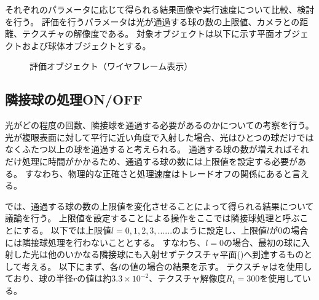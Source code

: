 それぞれのパラメータに応じて得られる結果画像や実行速度について比較、検討を行う。
評価を行うパラメータは光が通過する球の数の上限値、カメラとの距離、テクスチャの解像度である。
対象オブジェクトは以下に示す平面オブジェクトおよび球体オブジェクトとする。
\begin{figure}[htbp]
  \centering
{}
  \caption{評価オブジェクト（ワイヤフレーム表示）}
  \label{FEvalObject}
\end{figure}


\subsection{隣接球の処理ON/OFF}
\label{SSLimitNeighborSphere}

光がどの程度の回数、隣接球を通過する必要があるのかについての考察を行う。
光が複眼表面に対して平行に近い角度で入射した場合、光はひとつの球だけではなくふたつ以上の球を通過すると考えられる。
通過する球の数が増えればそれだけ処理に時間がかかるため、通過する球の数には上限値を設定する必要がある。
すなわち、物理的な正確さと処理速度はトレードオフの関係にあると言える。

では、通過する球の数の上限値を変化させることによって得られる結果について議論を行う。
上限値を設定することによる操作をここでは隣接球処理と呼ぶことにする。
以下では上限値$l = 0,1,2,3, ......$のように設定し、上限値$l$が$0$の場合には隣接球処理を行わないこととする。
すなわち、$l = 0$の場合、最初の球に入射した光は他のいかなる隣接球にも入射せずテクスチャ平面()へ到達するものとして考える。
以下にまず、各$l$の値の場合の結果を示す。
テクスチャは\figref{}を使用しており、球の半径$r$の値は約$3.3 \times 10^{-2}$、テクスチャ解像度$R_t = 300$を使用している。

